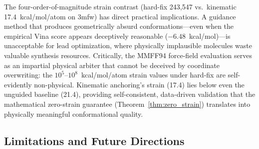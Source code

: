 \documentclass{article}
\begin{document}
The four-order-of-magnitude strain contrast (hard-fix 243,547 vs.\ kinematic
17.4~kcal/mol/atom on 3mfw) has direct practical implications.  A guidance
method that produces geometrically absurd conformations---even when the
empirical Vina score appears deceptively reasonable ($-6.48$~kcal/mol)---is
unacceptable for lead optimization, where physically implausible molecules
waste valuable synthesis resources.  Critically, the MMFF94 force-field
evaluation serves as an impartial physical arbiter that cannot be deceived
by coordinate overwriting: the $10^5$--$10^8$~kcal/mol/atom strain values
under hard-fix are self-evidently non-physical.  Kinematic anchoring's
strain (17.4) lies below even the unguided baseline (21.4), providing
self-consistent, data-driven validation that the mathematical zero-strain
guarantee (Theorem~\ref{thm:zero_strain}) translates into physically
meaningful conformational quality.

\subsection{Limitations and Future Directions}
\end{document}
